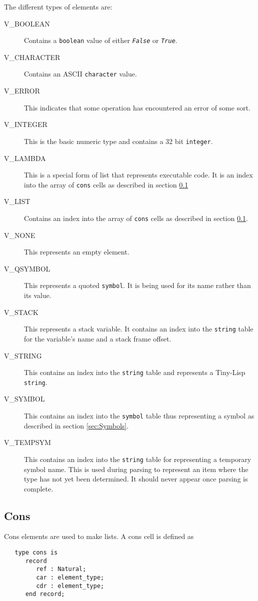 \documentclass[10pt, openany]{book}
\newcommand{\constant}[1]{\emph{\texttt{#1}}}
\newcommand{\datatype}[1]{\texttt{#1}}
\newcommand{\tl}{Tiny-Lisp}
\begin{document}
The different types of elements are:
\begin{description}
  \item[V\_BOOLEAN] Contains a \datatype{boolean} value of either \constant{False} or \constant{True}.
  \item[V\_CHARACTER] Contains an ASCII \datatype{character} value.
  \item[V\_ERROR] This indicates that some operation has encountered an error of some sort.
  \item[V\_INTEGER] This is the basic numeric type and contains a 32 bit \datatype{integer}.
  \item[V\_LAMBDA] This is a special form of list that represents executable code.  It is an index into the array of \datatype{cons} cells as described in section \ref{sec:Cons}
  \item[V\_LIST] Contains an index into the array of \datatype{cons} cells as described in section \ref{sec:Cons}.
  \item[V\_NONE] This represents an empty element.
  \item[V\_QSYMBOL] This represents a quoted \datatype{symbol}.  It is being used for its name rather than its value.
  \item[V\_STACK] This represents a stack variable.  It contains an index into the \datatype{string} table for the variable's name and a stack frame offset.
  \item[V\_STRING] This contains an index into the \datatype{string} table and represents a \tl{} \datatype{string}.
  \item[V\_SYMBOL] This contains an index into the \datatype{symbol} table thus representing a symbol as described in section \ref{sec:Symbols}.
  \item[V\_TEMPSYM] This contains an index into the \datatype{string} table for representing a temporary symbol name.  This is used during parsing to represent an item where the type has not yet been determined.  It should never appear once parsing is complete.
\end{description}

\subsection{Cons}
\label{sec:Cons}
Cons elements are used to make lists.  A cons cell is defined as
\begin{lstlisting}
   type cons is
      record
         ref : Natural;
         car : element_type;
         cdr : element_type;
      end record;
\end{lstlisting}
\end{document}
